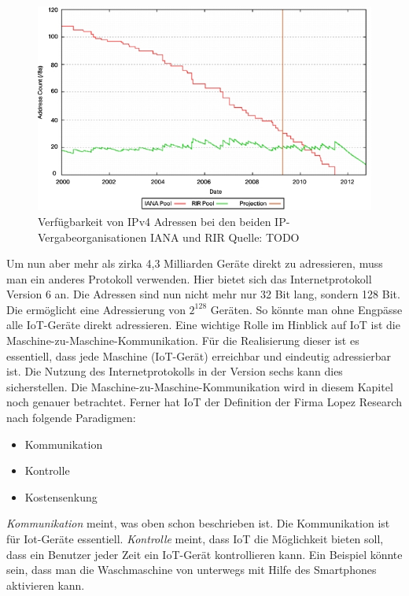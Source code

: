 \begin{figure}
\includegraphics[scale=0.7]{bilder/ipv4cisco} 
\caption{Verfügbarkeit von IPv4 Adressen bei den beiden IP-Vergabeorganisationen IANA und RIR Quelle: TODO}
\label{IPv4}
\end{figure}

Um nun aber mehr als zirka 4,3 Milliarden Geräte direkt zu adressieren, muss man ein anderes Protokoll verwenden. Hier bietet sich das Internetprotokoll Version 6 an. Die Adressen sind nun nicht mehr nur 32 Bit lang, sondern 128 Bit. Die ermöglicht eine Adressierung von $2^{128}$ Geräten. So könnte man ohne Engpässe alle IoT-Geräte direkt adressieren. 
Eine wichtige Rolle im Hinblick auf IoT ist die Maschine-zu-Maschine-Kommunikation. Für die Realisierung dieser ist es essentiell, dass jede Maschine (IoT-Gerät) erreichbar und eindeutig adressierbar ist. Die Nutzung des Internetprotokolls in der Version sechs kann dies sicherstellen. Die Maschine-zu-Maschine-Kommunikation wird in diesem Kapitel noch genauer betrachtet.     
Ferner hat IoT der Definition der Firma Lopez Research nach folgende Paradigmen:
\begin{itemize}
\item Kommunikation
\item Kontrolle
\item Kostensenkung
\end{itemize} 
\textit{Kommunikation} meint, was oben schon beschrieben ist. Die Kommunikation ist für Iot-Geräte essentiell. \textit{Kontrolle} meint, dass IoT die Möglichkeit bieten soll, dass ein Benutzer jeder Zeit ein IoT-Gerät kontrollieren kann. Ein Beispiel könnte sein, dass man die Waschmaschine von unterwegs mit Hilfe des Smartphones aktivieren kann. 

